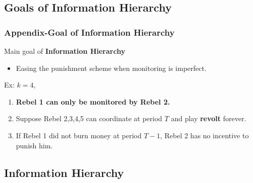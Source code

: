 \documentclass[9pt]{beamer}
\begin{document}
\subsection{Goals of Information Hierarchy}
\begin{frame}[label=alt_IH]
   \frametitle{Appendix-Goal of Information Hierarchy}


Main goal of \textbf{Information Hierarchy}
\begin{itemize}
\item Easing the punishment scheme when monitoring is imperfect.
\end{itemize}

Ex: $k=4$,
\begin{center}
\end{center}

\begin{enumerate}
\item \textbf{Rebel 1 can only be monitored by Rebel 2.}
\item Suppose Rebel 2,3,4,5 can coordinate at period $T$ and play \textbf{revolt} forever.
\item If Rebel 1 did not burn money at period $T-1$, Rebel 2 has no incentive to punish him.
\end{enumerate}

\end{frame}


\subsection{Information Hierarchy}
\end{document}
